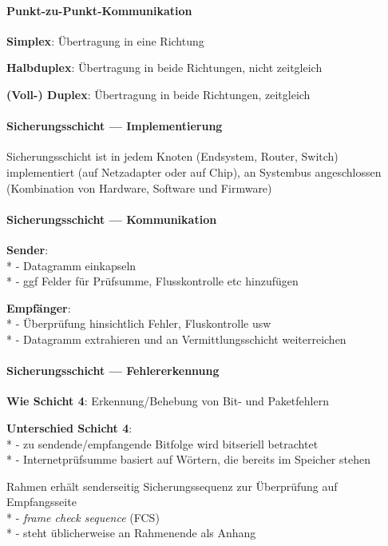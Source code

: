 \paragraph{Punkt-zu-Punkt-Kommunikation}
\begin{items}
  \item \textbf{Simplex}: Übertragung in eine Richtung
  \item \textbf{Halbduplex}: Übertragung in beide Richtungen, nicht zeitgleich
  \item \textbf{(Voll-) Duplex}: Übertragung in beide Richtungen, zeitgleich
\end{items}

\paragraph{Sicherungsschicht --- Implementierung}
\begin{items}
  \item Sicherungsschicht ist in jedem Knoten (Endsystem, Router, Switch) implementiert (auf Netzadapter oder auf Chip), an Systembus angeschlossen (Kombination von Hardware, Software und Firmware)
\end{items}

\paragraph{Sicherungsschicht --- Kommunikation}
\begin{items}
  \item \textbf{Sender}: \\*
    - Datagramm einkapseln \\*
    - ggf Felder für Prüfsumme, Flusskontrolle etc hinzufügen
  \item \textbf{Empfänger}: \\*
    - Überprüfung hinsichtlich Fehler, Fluskontrolle usw \\*
    - Datagramm extrahieren und an Vermittlungsschicht weiterreichen
\end{items}

\paragraph{Sicherungsschicht --- Fehlererkennung}
\begin{items}
  \item \textbf{Wie Schicht 4}: Erkennung/Behebung von Bit- und Paketfehlern
  \item \textbf{Unterschied Schicht 4}: \\*
    - zu sendende/empfangende Bitfolge wird bitseriell betrachtet \\*
    - Internetprüfsumme basiert auf Wörtern, die bereits im Speicher stehen
  \item Rahmen erhält senderseitig Sicherungssequenz zur Überprüfung auf Empfangsseite \\*
    - \emph{frame check sequence} (FCS) \\*
    - steht üblicherweise an Rahmenende als Anhang
\end{items}

